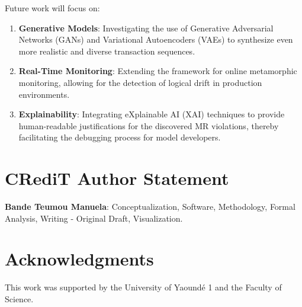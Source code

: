 \documentclass[review]{elsarticle}
\begin{document}
Future work will focus on:
\begin{enumerate}
    \item \textbf{Generative Models}: Investigating the use of Generative Adversarial Networks (GANs) and Variational Autoencoders (VAEs) to synthesize even more realistic and diverse transaction sequences.
    \item \textbf{Real-Time Monitoring}: Extending the framework for online metamorphic monitoring, allowing for the detection of logical drift in production environments.
    \item \textbf{Explainability}: Integrating eXplainable AI (XAI) techniques to provide human-readable justifications for the discovered MR violations, thereby facilitating the debugging process for model developers.
\end{enumerate}

\section*{CRediT Author Statement}
\textbf{Bande Teumou Manuela}: Conceptualization, Software, Methodology, Formal Analysis, Writing - Original Draft, Visualization.

\section*{Acknowledgments}
This work was supported by the University of Yaoundé 1 and the Faculty of Science.
\end{document}
